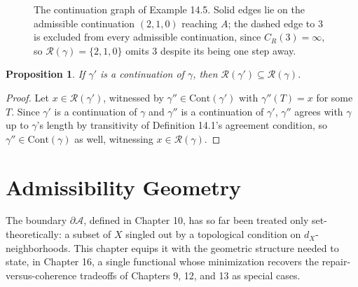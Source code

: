 \documentclass[11pt]{book}
\newtheorem{proposition}[theorem]{Proposition}
\begin{document}
\begin{figure}[htb]
\centering
{}
\caption{The continuation graph of Example 14.5. Solid edges lie on the admissible continuation $(2,1,0)$ reaching $A$; the dashed edge to $3$ is excluded from every admissible continuation, since $C_R(3)=\infty$, so $\mathcal R(\gamma) = \{2,1,0\}$ omits $3$ despite its being one step away.}
\label{fig:continuation-dag}
\end{figure}

\begin{proposition}
If $\gamma'$ is a continuation of $\gamma$, then $\mathcal R(\gamma') \subseteq \mathcal R(\gamma)$.
\end{proposition}

\begin{proof}
Let $x \in \mathcal R(\gamma')$, witnessed by $\gamma'' \in \mathrm{Cont}(\gamma')$ with $\gamma''(T)=x$ for some $T$. Since $\gamma'$ is a continuation of $\gamma$ and $\gamma''$ is a continuation of $\gamma'$, $\gamma''$ agrees with $\gamma$ up to $\gamma$'s length by transitivity of Definition 14.1's agreement condition, so $\gamma'' \in \mathrm{Cont}(\gamma)$ as well, witnessing $x \in \mathcal R(\gamma)$.
\end{proof}

\chapter{Admissibility Geometry}

The boundary $\partial \mathcal A$, defined in Chapter 10, has so far been treated only set-theoretically: a subset of $X$ singled out by a topological condition on $d_X$-neighborhoods. This chapter equips it with the geometric structure needed to state, in Chapter 16, a single functional whose minimization recovers the repair-versus-coherence tradeoffs of Chapters 9, 12, and 13 as special cases.
\end{document}
